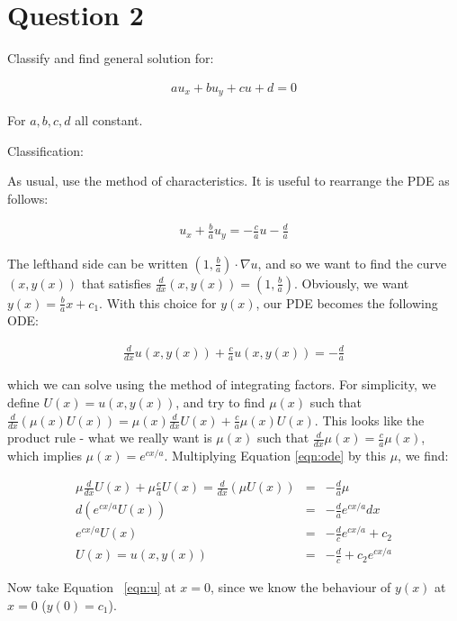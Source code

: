 \documentclass[a4paper,12pt]{article}
\begin{document}
\section{Question 2}

Classify and find general solution for:

\begin{eqnarray}
au_x + bu_y + cu + d = 0\nonumber
\end{eqnarray}

For $a,b,c,d$ all constant.

Classification: 

As usual, use the method of characteristics. It is useful to rearrange the PDE as follows:

\begin{eqnarray}
u_x + \frac{b}{a}u_y = -\frac{c}{a}u - \frac{d}{a}\nonumber
\end{eqnarray}

The lefthand side can be written $(1,\frac{b}{a})\cdot\nabla u$, and so we want to find the curve $(x,y(x))$ that satisfies $\frac{d}{dx}(x,y(x)) = (1,\frac{b}{a})$. Obviously, we want $y(x) = \frac{b}{a}x + c_1$. With this choice for $y(x)$, our PDE becomes the following ODE:

\begin{eqnarray}
\frac{d}{dx}u(x,y(x)) + \frac{c}{a}u(x,y(x)) = - \frac{d}{a}\label{eqn:ode}
\end{eqnarray}

which we can solve using the method of integrating factors. For simplicity, we define $U(x) = u(x,y(x))$, and try to find $\mu(x)$ such that $\frac{d}{dx}(\mu(x)U(x)) = \mu(x)\frac{d}{dx}U(x) + \frac{c}{a}\mu(x)U(x)$. This looks like the product rule - what we really want is $\mu(x)$ such that $\frac{d}{dx}\mu(x) = \frac{c}{a}\mu(x)$, which implies $\mu(x) = e^{cx/a}$. Multiplying Equation \ref{eqn:ode} by this $\mu$, we find:

\begin{eqnarray}
\mu\frac{d}{dx}U(x) + \mu\frac{c}{a}U(x)= \frac{d}{dx}(\mu U(x))&=& - \frac{d}{a}\mu\nonumber\\
d(e^{cx/a}U(x)) &=& -\frac{d}{a}e^{cx/a} dx\nonumber\\
e^{cx/a}U(x) &=& -\frac{d}{c}e^{cx/a} + c_2\nonumber\\
U(x) = u(x,y(x)) &=& -\frac{d}{c} + c_2 e^{cx/a}
\label{eqn:u}
\end{eqnarray}

Now take Equation ~\ref{eqn:u} at $x = 0$, since we know the behaviour of $y(x)$ at $x = 0$ ($y(0) = c_1$).
\end{document}
